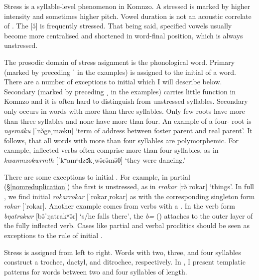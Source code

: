 Stress is a syllable-level phenomenon in Komnzo. A stressed  is marked by higher intensity and sometimes higher pitch. Vowel duration is not an acoustic correlate of . The  [ə̆] is frequently stressed. That being said, specified vowels usually become more centralised and shortened in word-final position, which is always unstressed.

The prosodic domain of stress asignment is the phonological word. Primary  (marked by preceding ˈ in the examples) is assigned to the initial  of a word. There are a number of exceptions to initial  which I will describe below. Secondary  (marked by preceding ˌ in the examples) carries little function in Komnzo and it is often hard to distinguish from unstressed syllables. Secondary  only occurs in words with more than three syllables. Only few roots have more than three syllables and none have more than four. An example of a four- root is \emph{ngemäku} [ˈnə̆{\ᵑ}geˌmæku] `term of address between foster parent and real parent'. It follows, that all words with more than four syllables are polymorphemic. For example, inflected verbs often comprise more than four syllables, as in \emph{kwamnzokwrmth} [ˈkʷamⁿdzɞ̆kˌwə̆rə̆mə̆θ] `they were dancing.'

There are some exceptions to initial . For example, in partial  ({\S}\ref{nomreduplication}) the first  is unstressed, as in \emph{rrokar} [rə̆ˈrokar] `things'. In full , we find initial  \emph{rokarrokar} [ˈrokarˌrokar] as with the corresponding singleton form \emph{rokar} [ˈrokar]. Another example comes from verbs with a . In the verb form \emph{bŋatrakwr} [bə̆ˈŋatrakʷə̆r] `s/he falls there', the  \emph{b=} (\Med{}) attaches to the outer layer of the fully inflected verb. Cases like partial  and verbal proclitics should be seen as exceptions to the rule of initial .

Stress is assigned from left to right. Words with two, three, and four syllables construct a trochee, dactyl, and ditrochee, respectively. In , I present templatic  patterns for words between two and four syllables of length.

